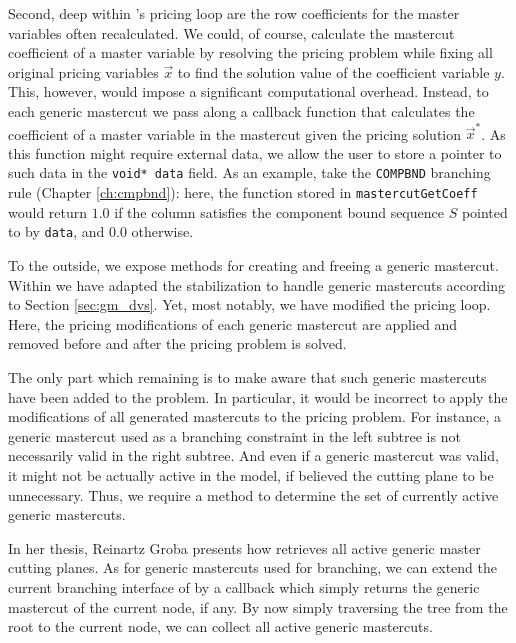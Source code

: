 Second, deep within \GCG{}'s pricing loop are the row coefficients for the master variables often recalculated. We could, of course, calculate the mastercut coefficient of a master variable by resolving the pricing problem while fixing all original pricing variables $\vec{x}$ to find the solution value of the coefficient variable $y$. This, however, would impose a significant computational overhead. Instead, to each generic mastercut we pass along a callback function that calculates the coefficient of a master variable in the mastercut given the pricing solution $\vec{x}^*$. As this function might require external data, we allow the user to store a pointer to such data in the \texttt{void* data} field. As an example, take the \texttt{COMPBND} branching rule (Chapter \ref{ch:cmpbnd}): here, the function stored in \texttt{mastercutGetCoeff} would return $1.0$ if the column satisfies the component bound sequence $S$ pointed to by \texttt{data}, and $0.0$ otherwise.

To the outside, we expose methods for creating and freeing a generic mastercut. Within \GCG{} we have adapted the stabilization to handle generic mastercuts according to Section \ref{sec:gm_dvs}. Yet, most notably, we have modified the pricing loop. Here, the pricing modifications of each generic mastercut are applied and removed before and after the pricing problem is solved.

The only part which remaining is to make \GCG{} aware that such generic mastercuts have been added to the problem. In particular, it would be incorrect to apply the modifications of all generated mastercuts to the pricing problem. For instance, a generic mastercut used as a branching constraint in the left subtree is not necessarily valid in the right subtree. And even if a generic mastercut was valid, it might not be actually active in the model, if \SCIP{} believed the cutting plane to be unnecessary. Thus, we require a method to determine the set of currently active generic mastercuts.

In her thesis, Reinartz Groba \cite{reinartzgroba2024todo} presents how \GCG{} retrieves all active generic master cutting planes. As for generic mastercuts used for branching, we can extend the current branching interface of \GCG{} by a callback which simply returns the generic mastercut of the current node, if any. By now simply traversing the tree from the root to the current node, we can collect all active generic mastercuts.

